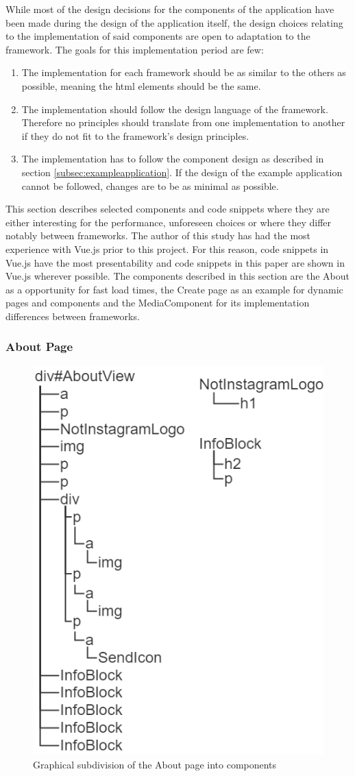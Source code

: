 \documentclass[a4paper, 12pt]{article}
\begin{document}
While most of the design decisions for the components of the application have been made during the design of the application itself, the design choices relating to the implementation of said components are open to adaptation to the framework.
The goals for this implementation period are few:

\begin{enumerate}
  \item The implementation for each framework should be as similar to the others as possible, meaning the \acrshort{html} elements should be the same.
  \item The implementation should follow the design language of the framework.
  Therefore no principles should translate from one implementation to another if they do not fit to the framework's design principles.
  \item The implementation has to follow the component design as described in section \ref{subsec:exampleapplication}.
  If the design of the example application cannot be followed, changes are to be as minimal as possible.
\end{enumerate}

This section describes selected components and code snippets where they are either interesting for the performance, unforeseen choices or where they differ notably between frameworks.
The author of this study has had the most experience with Vue.js prior to this project.
For this reason, code snippets in Vue.js have the most presentability and code snippets in this paper are shown in Vue.js wherever possible.
The components described in this section are the About as a opportunity for fast load times, the Create page as an example for dynamic pages and components and the MediaComponent for its implementation differences between frameworks.

\subsubsection{About Page}

\begin{figure}[h!]
  \begin{center}
  \includegraphics[width=0.4\linewidth, keepaspectratio]{diagrams/about-dom-2.png}
  \end{center}
  \caption{Graphical subdivision of the About page into components}\label{fig:graphicalAboutPage}
\end{figure}
\end{document}
